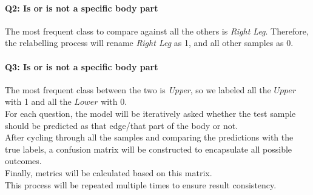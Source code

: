 \paragraph{Q2: Is or is not a specific body part} The most frequent class to compare against all the others is \textit{Right Leg}.
Therefore, the relabelling process will rename \textit{Right Leg} as 1, and all other samples as 0.

\paragraph{Q3: Is or is not a specific body part} The most frequent class between the two is \textit{Upper}, so we labeled all the $Upper$ with 1 and all the $Lower$ with 0.\\

For each question, the model will be iteratively asked whether the test sample should be predicted as that edge/that part of the body or not.\\
After cycling through all the samples and comparing the predictions with the true labels, a confusion matrix will be constructed to encapsulate all possible outcomes.\\ 
Finally, metrics will be calculated based on this matrix.\\
This process will be repeated multiple times to ensure result consistency.
